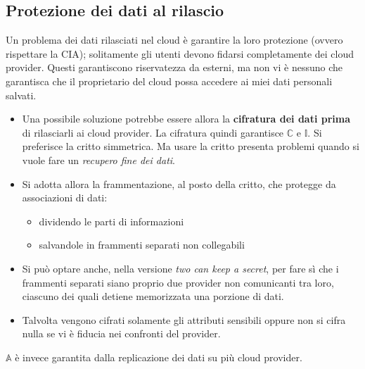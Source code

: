 \subsection{Protezione dei dati al rilascio}
Un problema dei dati rilasciati nel cloud è garantire la loro protezione (ovvero rispettare la CIA); solitamente gli utenti devono fidarsi completamente dei cloud provider. Questi garantiscono riservatezza da esterni, ma non vi è nessuno che garantisca che il proprietario del cloud possa accedere ai miei dati personali salvati.
\begin{itemize}
    \item Una possibile soluzione potrebbe essere allora la \textbf{cifratura dei dati prima} di rilasciarli ai cloud provider. La cifratura quindi garantisce $\mathbb{C}$ e $\mathbb{I}$. Si preferisce la critto simmetrica. Ma usare la critto presenta problemi quando si vuole fare un \textit{recupero fine dei dati}.
    \item Si adotta allora la frammentazione, al posto della critto, che protegge da associazioni di dati:
    \begin{itemize}
        \item dividendo le parti di informazioni
        \item salvandole in frammenti separati non collegabili
    \end{itemize}
    \item Si può optare anche, nella versione \textit{two can keep a secret}, per fare sì che i frammenti separati siano proprio due provider non comunicanti tra loro, ciascuno dei quali detiene memorizzata una porzione di dati.
    \item Talvolta vengono cifrati solamente gli attributi sensibili oppure non si cifra nulla se vi è fiducia nei confronti del provider.
\end{itemize}
$\mathbb{A}$ è invece garantita dalla replicazione dei dati su più cloud provider.

